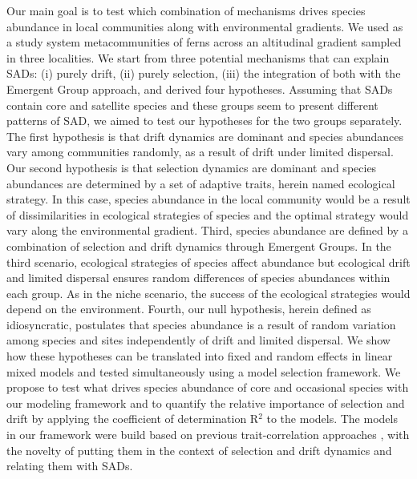 \documentclass[12pt]{article}
\begin{document}
Our main goal is to test which combination of mechanisms drives species abundance in local communities along with environmental gradients. We used as a study system metacommunities of ferns across an altitudinal gradient sampled in three localities. 
We start from three potential mechanisms that can explain SADs: (i) purely drift,  (ii) purely selection, (iii) the integration of both with the Emergent Group approach, and derived four hypotheses. %
Assuming
that SADs contain core and satellite species and these groups seem to present different patterns of SAD, we aimed to test our hypotheses for the two groups separately. 
The first hypothesis is that drift dynamics are dominant and species abundances vary among communities
randomly, as a result of drift under limited dispersal.
Our second hypothesis is that selection dynamics are dominant and species abundances are determined by a set of adaptive traits, herein named ecological strategy. 
In this case, species abundance in the local community would be a result of dissimilarities in ecological strategies of species and the optimal strategy would vary along the environmental gradient. 
Third, species abundance are defined by a combination of selection and drift dynamics through Emergent Groups. In the third scenario, ecological strategies of species affect abundance but ecological drift and limited dispersal ensures random differences of species abundances within each group. As in the niche scenario, the success of the ecological strategies would depend on the environment.
Fourth, our null hypothesis, herein defined as idiosyncratic, postulates that species abundance is a result of random variation among species and sites independently of drift and limited dispersal.
We show how these hypotheses can be translated into fixed and random effects in linear mixed models and tested simultaneously using a model selection framework.
We propose to test what drives species abundance of core and occasional species with our modeling framework and to quantify the relative importance of selection and drift by applying the coefficient of determination R{$^2$} \citep{Nakagawa2013, Nakagawa2017} to the models. The models in our framework were build based on previous trait-correlation approaches \citep{Pollock2012, Jamil2013, Jamil2013a, Miller2019, TerBraak2019}, with the novelty of putting them in the context of selection and drift dynamics and relating them with SADs.
\end{document}
